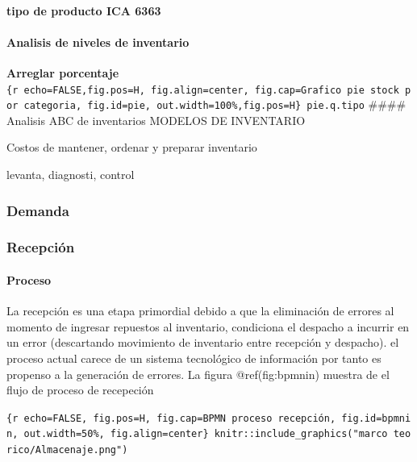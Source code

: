 \documentclass[11pt]{article}
\begin{document}
\hypertarget{tipo-de-producto-ica-6363}{%
\paragraph{tipo de producto ICA 6363}\label{tipo-de-producto-ica-6363}}

\hypertarget{analisis-de-niveles-de-inventario}{%
\paragraph{Analisis de niveles de
inventario}\label{analisis-de-niveles-de-inventario}}

\textbf{Arreglar porcentaje}
\texttt{\{r\ echo=FALSE,fig.pos=\textquotesingle{}H\textquotesingle{},\ fig.align=\textquotesingle{}center\textquotesingle{},\ fig.cap=\textquotesingle{}Grafico\ pie\ stock\ por\ categoria\textquotesingle{},\ fig.id=\textquotesingle{}pie\textquotesingle{},\ out.width=\textquotesingle{}100\%\textquotesingle{},fig.pos=\textquotesingle{}H\textquotesingle{}\}\ pie.q.tipo}
\#\#\#\# Analisis ABC de inventarios MODELOS DE INVENTARIO

Costos de mantener, ordenar y preparar inventario

levanta, diagnosti, control

\hypertarget{demanda}{%
\subsubsection{Demanda}\label{demanda}}

\hypertarget{recepciuxf3n}{%
\subsubsection{Recepción}\label{recepciuxf3n}}

\hypertarget{proceso}{%
\paragraph{Proceso}\label{proceso}}

La recepción es una etapa primordial debido a que la eliminación de
errores al momento de ingresar repuestos al inventario, condiciona el
despacho a incurrir en un error (descartando movimiento de inventario
entre recepción y despacho). el proceso actual carece de un sistema
tecnológico de información por tanto es propenso a la generación de
errores. La figura @ref(fig:bpmnin) muestra de el flujo de proceso de
recepeción

\texttt{\{r\ echo=FALSE,\ fig.pos=\textquotesingle{}H\textquotesingle{},\ fig.cap=\textquotesingle{}BPMN\ proceso\ recepción\textquotesingle{},\ fig.id=\textquotesingle{}bpmnin\textquotesingle{},\ out.width=\textquotesingle{}50\%\textquotesingle{},\ fig.align=\textquotesingle{}center\textquotesingle{}\}\ knitr::include\_graphics("marco\ teorico/Almacenaje.png")}
\end{document}
